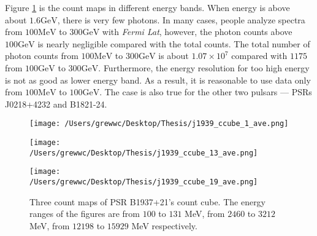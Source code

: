 \documentclass[12pt]{report}
\begin{document}
              Figure \ref{fig: j1939_count_cube_ave} is the count maps in different energy bands.
              When energy is above about $1.6\mbox{GeV}$, there is very few photons. In many cases,
              people analyze spectra from $100\mbox{MeV}$ to $300\mbox{GeV}$ with 
              \textit{Fermi Lat}, however, the photon counts above $100\mbox{GeV}$ is nearly 
              negligible compared with the total counts. The total number of photon counts from 
              $100\mbox{MeV}$ to $300\mbox{GeV}$ is about $1.07\times10^7$ compared with $1175$ from
              $100\mbox{GeV}$ to $300\mbox{GeV}$. Furthermore, the energy resolution for too high
              energy is not as good as lower energy band. As a result, it is reasonable to use data
              only from $100\mbox{MeV}$ to $100\mbox{GeV}$. The case is also true for the other two
              pulsars --- PSRs J0218+4232 and B1821-24. 

            \begin{figure}[!ht]
              \begin{minipage}{0.32\textwidth}
                \begin{center} 
                  \texttt{[image: /Users/grewwc/Desktop/Thesis/j1939\_ccube\_1\_ave.png]}
                \end{center}
              \end{minipage}
              \begin{minipage}{0.32\textwidth}
                \begin{center}
                  \texttt{[image: /Users/grewwc/Desktop/Thesis/j1939\_ccube\_13\_ave.png]}
                \end{center}
              \end{minipage}
              \begin{minipage}{0.32\textwidth}
                \begin{center}
                \texttt{[image: /Users/grewwc/Desktop/Thesis/j1939\_ccube\_19\_ave.png]}
                \end{center}
              \end{minipage}
              \caption{Three count maps of PSR B1937+21's count cube. The energy ranges of the 
                figures are from $100$ to $131$ MeV, from $2460$ to $3212$ MeV, from $12198$ to
                $15929$ MeV respectively.}
              \label{fig: j1939_count_cube_ave}
            \end{figure}
\end{document}
